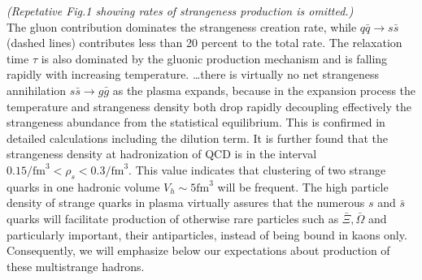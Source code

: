 \begin{mdframed}[linecolor=gray,roundcorner=12pt,backgroundcolor=Dandelion!15,linewidth=1pt,leftmargin=0cm,rightmargin=0cm,topline=true,bottomline=true,skipabove=12pt]
\textit{(Repetative Fig.1 showing rates of  strangeness production is omitted.)}\\
The gluon contribution dominates the strange\-ness creation rate, while $q \bar{q} \to  s\bar{s}$ (dashed lines) contributes less than 20 percent to the total rate. The relaxation time $\tau$ is also dominated by the gluonic production mechanism and is falling rapidly with increasing temperature.%
\ldots there is virtually no net strangeness annihilation $s \bar s\rightarrow g\bar g$ as the plasma expands, because in the expansion process the temperature and strangeness density both drop rapidly decoupling effectively the strangeness abundance from the statistical equilibrium. This is confirmed in detailed calculations including the dilution term\footnotemark[4]. It is further found that the strangeness density at hadronization of QCD is in the interval 
$0.15/\mathrm{fm}^3 < \rho_s <  0.3/\mathrm{fm}^3$. This value indicates that clustering of two strange quarks in one hadronic volume $V_h \sim  5 \mathrm{fm}^3$ will be frequent. The high particle density of strange quarks in plasma virtually assures that the numerous $s$ and $\bar s$ quarks will facilitate production of otherwise rare particles such as $\bar \Xi, \bar \Omega$ and particularly important, their antiparticles, instead of being bound in kaons only. Consequently, we will emphasize below our expectations about production of these multistrange hadrons.



\end{mdframed}
